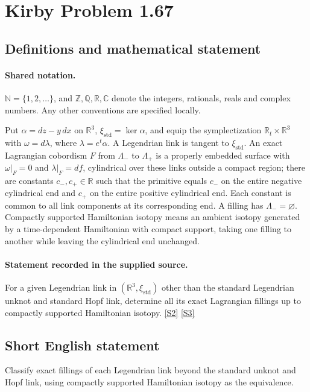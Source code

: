 \documentclass[11pt]{article}
\newcommand{\sref}[2]{\hyperlink{source:#1:#2}{[S#2]}}
\begin{document}
\section{Kirby Problem 1.67}\label{statement}

\subsection{Definitions and mathematical statement}

\paragraph{Shared notation.}$\mathbb N=\{1,2,\ldots\}$, and $\mathbb Z,\mathbb Q,\mathbb R,\mathbb C$ denote the integers, rationals, reals and complex numbers. Any other conventions are specified locally.


Put $\alpha=dz-y\,dx$ on $\mathbb R^3$, $\xi_{\mathrm{std}}=\ker\alpha$, and equip the symplectization $\mathbb R_t\times\mathbb R^3$ with $\omega=d\lambda$, where $\lambda=e^t\alpha$. A Legendrian link is tangent to $\xi_{\mathrm{std}}$. An exact Lagrangian cobordism $F$ from $\Lambda_-$ to $\Lambda_+$ is a properly embedded surface with $\omega|_F=0$ and $\lambda|_F=df$, cylindrical over these links outside a compact region; there are constants $c_-,c_+\in\mathbb R$ such that the primitive equals $c_-$ on the entire negative cylindrical end and $c_+$ on the entire positive cylindrical end. Each constant is common to all link components at its corresponding end. A filling has $\Lambda_-=\varnothing$. Compactly supported Hamiltonian isotopy means an ambient isotopy generated by a time-dependent Hamiltonian with compact support, taking one filling to another while leaving the cylindrical end unchanged.
\paragraph{Statement recorded in the supplied source.}
For a given Legendrian link in $(\mathbb R^3,\xi_{\mathrm{std}})$ other than the standard Legendrian unknot and standard Hopf link, determine all its exact Lagrangian fillings up to compactly supported Hamiltonian isotopy. \sref{statement}{2} \sref{statement}{3}

\subsection{Short English statement}
Classify exact fillings of each Legendrian link beyond the standard unknot and Hopf link, using compactly supported Hamiltonian isotopy as the equivalence.
\end{document}
